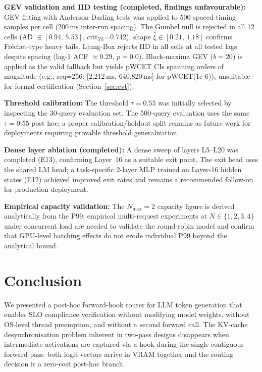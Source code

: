 \documentclass[conference]{IEEEtran}
\begin{document}
\textbf{GEV validation and IID testing (completed, findings unfavourable):}
GEV fitting with Anderson-Darling tests was applied to 500 spaced
timing samples per cell (200\,ms inter-run spacing).
The Gumbel null is rejected in all 12 cells (AD $\in [0.94,\,5.53]$,
crit$_{5\%}$=0.742); shape $\hat{\xi} \in [0.21,\,1.18]$ confirms
Fréchet-type heavy tails.
Ljung-Box rejects IID in all cells at all tested lags despite spacing
(lag-1 ACF ${\approx}0.29$, $p{=}0.0$).
Block-maxima GEV ($b{=}20$) is applied as the valid fallback but
yields pWCET CIs spanning orders of magnitude (e.g., seq=256:
[2{,}212\,ms, 640{,}820\,ms] for pWCET(1e-6)), unsuitable for
formal certification (Section~\ref{sec:evt}).

\textbf{Threshold calibration:}
The threshold $\tau=0.55$ was initially selected by inspecting the
30-query evaluation set.
The 500-query evaluation uses the same $\tau=0.55$ post-hoc; a proper
calibration/holdout split remains as future work for deployments
requiring provable threshold generalization.

\textbf{Dense layer ablation (completed):}
A dense sweep of layers L5--L20 was completed (E13), confirming
Layer~16 as a suitable exit point.
The exit head uses the shared LM head; a task-specific 2-layer MLP
trained on Layer-16 hidden states (E12) achieved improved exit rates
and remains a recommended follow-on for production deployment.

\textbf{Empirical capacity validation:}
The $N_{\max}=2$ capacity figure is derived analytically from the P99;
empirical multi-request experiments at $N\in\{1,2,3,4\}$ under
concurrent load are needed to validate the round-robin model and
confirm that GPU-level batching effects do not erode individual P99
beyond the analytical bound.

\section{Conclusion}

We presented a post-hoc forward-hook router for LLM token generation that
enables SLO compliance verification without modifying model weights,
without OS-level thread preemption, and without a second forward call.
The KV-cache desynchronisation problem inherent in two-pass designs
disappears when intermediate activations are captured via a hook during
the single contiguous forward pass: both logit vectors arrive in VRAM
together and the routing decision is a zero-cost post-hoc branch.
\end{document}
